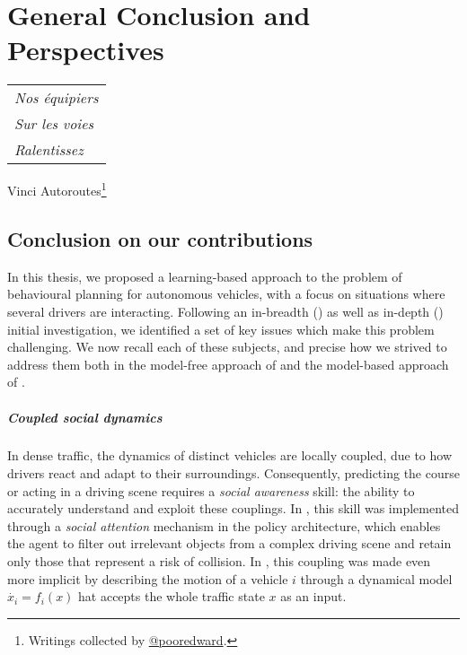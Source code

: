 
\makeatletter
\def\toclevel@chapter{-1}
\makeatother

\chapter{General Conclusion and Perspectives}
\label{chapter:conclusion}

\begin{flushright}
	\begin{tabular}{@{}l@{}}
		\emph{Nos équipiers}\\
		\emph{\hspace*{1.0cm}Sur les voies}\\
		\emph{\hspace*{0.5cm}Ralentissez}\\
	\end{tabular}

	Vinci Autoroutes\footnote{Writings collected by \href{https://twitter.com/pooredward/status/1273249408231124994}
		{@pooredward}.}\hspace*{1cm}
\end{flushright}

\section{Conclusion on our contributions}
In this thesis, we proposed a learning-based approach to the problem of behavioural planning for autonomous vehicles, with a focus on situations where several drivers are interacting. Following an in-breadth () as well as in-depth () initial investigation, we identified a set of key issues which make this problem challenging. We now recall each of these subjects, and precise how we strived to address them both in the model-free approach of  and the model-based approach of .


\paragraph{Coupled social dynamics}
In dense traffic, the dynamics of distinct vehicles are locally coupled, due to how drivers react and adapt to their surroundings. Consequently, predicting the course or acting in a driving scene requires a \emph{social awareness} skill: the ability to accurately understand and exploit these couplings.
In , this skill was implemented through a \emph{social attention} mechanism in the policy architecture, which enables the agent to filter out irrelevant objects from a complex driving scene and retain only those that represent a risk of collision. In , this coupling was made even more implicit by describing the motion of a vehicle $i$ through a dynamical model $\dot{x_i} = f_i(x)$ hat accepts the whole traffic state $x$ as an input.


